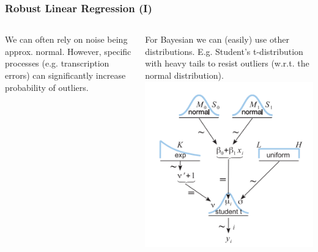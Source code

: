 \documentclass[usenames,dvipsnames,table]{beamer}
\begin{document}
\begin{frame}
\frametitle{Robust Linear Regression (I)}
\begin{columns}
We can often rely on noise being approx. normal. However, specific processes (e.g. transcription errors) can significantly increase probability of outliers.

\vspace{1em}
For Bayesian we can (easily) use other distributions. E.g. Student's t-distribution with heavy tails to resist outliers (w.r.t. the normal distribution).
\includegraphics[width=\textwidth]{img/fig17_2}
\end{columns}
\end{frame}
\end{document}
